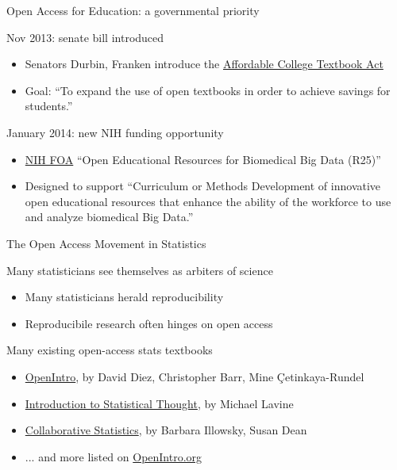 \begin{frame}{Open Access for Education: a governmental priority}

\begin{block}{Nov 2013: senate bill introduced}
\begin{itemize}
\item Senators Durbin, Franken introduce the \href{http://thomas.loc.gov/cgi-bin/query/z?c113:S.1704:}{Affordable College Textbook Act}
\item Goal: ``To expand the use of open textbooks in order to achieve savings for students.''
\end{itemize}
\end{block}

\begin{block}{January 2014: new NIH funding opportunity}
\begin{itemize}
\item \href{http://grants.nih.gov/grants/guide/rfa-files/RFA-HG-14-009.html}{NIH FOA} ``Open Educational Resources for Biomedical Big Data (R25)''
\item Designed to support ``Curriculum or Methods Development of innovative open educational resources that enhance the ability of the workforce to use and analyze biomedical Big Data.''
\end{itemize}
\end{block}

\end{frame}




\begin{frame}{The Open Access Movement in Statistics}

\begin{block}{Many statisticians see themselves as arbiters of science}
\begin{itemize}
\item Many statisticians herald reproducibility
\item Reproducibile research often hinges on open access
\end{itemize}
\end{block}

\begin{block}{Many existing open-access stats textbooks}
\begin{itemize}
\item \href{http://www.openintro.org/stat}{OpenIntro}, by David Diez, Christopher Barr, Mine \c{C}etinkaya-Rundel
\item \href{http://www.math.umass.edu/~lavine/Book/book.html}{Introduction to Statistical Thought}, by Michael Lavine
\item \href{http://cnx.org/content/col10522/latest/}{Collaborative Statistics}, by Barbara Illowsky, Susan Dean
\item ... and more listed on \href{http://www.openintro.org/stat/extras.php}{OpenIntro.org}
\end{itemize}
\end{block}

\end{frame}

